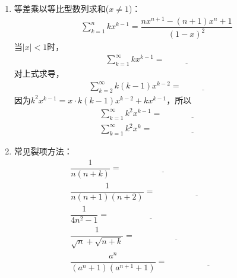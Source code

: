 \documentclass{article}
\newif\ifte
\begin{document}
\begin{multicols}{2}
\begin{enumerate}[leftmargin=20pt]
\item 等差乘以等比型数列求和($ x\neq 1 $)：
\begin{gather*}
    \sum_{k=1}^{n}kx^{k-1}=\dfrac{nx^{n+1}-(n+1)x^n+1}{(1-x)^2}
\end{gather*}
当$ |x|<1 $时，
\begin{gather*}
    \sum_{k=1}^{\infty} kx^{k-1}=\underline{\ \ifte 
        \dfrac{1}{(1-x)^2} \else \hspace{2cm} \fi\ }
\end{gather*}
对上式求导，
\begin{gather*}
    \sum_{k=2}^{\infty} k(k-1)x^{k-2}=\underline{\ \ifte 
    \dfrac{2}{(1-x)^3} \else \hspace{2cm} \fi\ }
\end{gather*}
因为$ k^2x^{k-1}=x\cdot k(k-1)x^{k-2}+kx^{k-1} $，所以
\begin{align*}
    \sum_{k=1}^{\infty} k^2x^{k-1}=&\ \underline{\ 
        \ifte \dfrac{1+x}{(1-x)^3}\else \hspace{2cm} \fi\ } \\
    \sum_{k=1}^{\infty} k^2x^{k}=&\ \underline{\ \ifte 
        \dfrac{x(1+x)}{(1-x)^3} \else \hspace{2cm} \fi\ }
\end{align*}

\item 常见裂项方法：
\begin{align*}
    &\dfrac{1}{n(n+k)}=\underline{\ \ifte 
        \dfrac{1}{k}\left(\dfrac{1}{n}-\dfrac{1}{n+k} \right)
        \else \hspace{4cm} \fi\ } \\
    &\dfrac{1}{n(n+1)(n+2)}=\underline{\ \ifte \dfrac{1}{2} 
        \left[\dfrac{1}{n(n+1)}- \dfrac{1}{(n+1)(n+2)}\right]
        \else \hspace{4cm} \fi\ } \\ 
    &\dfrac{1}{4n^2-1}=\underline{\ \ifte \dfrac{1}{2}
        \left(\dfrac{1}{2n-1}-\dfrac{1}{2n+1} \right)
        \else \hspace{4cm} \fi\ } \\
    &\dfrac{1}{\sqrt{n}+\sqrt{n+k}}=\underline{\ \ifte 
        \dfrac{1}{k}(\sqrt{n+k}-\sqrt{n})
        \else \hspace{4cm} \fi\ } \\ 
    &\dfrac{a^n}{(a^n+1)(a^{n+1}+1)}=\underline{\ \ifte 
        \dfrac{1}{a-1}\left(\dfrac{1}{a^n+1}-
        \dfrac{1}{a^{n+1}+1}\right)\else \hspace{4cm} \fi\ }
\end{align*}


\end{enumerate}
\end{multicols}
\end{document}
